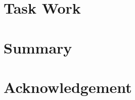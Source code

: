 \documentclass[11pt,twoside,a4paper]{article}
\begin{document}
\section{Task Work}\label{sec:taskwork}

\clearpage
\section{Summary}\label{sec:summ}

\section*{Acknowledgement}\label{sec:ackn}




\end{document}
